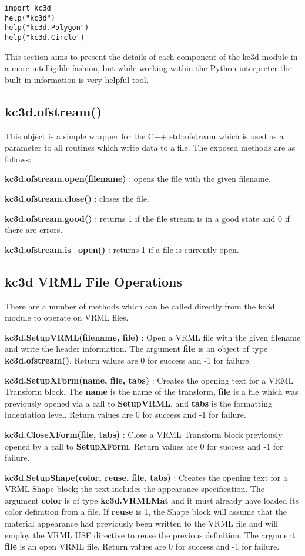 \documentclass[a4paper, dvipdfm]{article}
\begin{document}
\begin{verbatim}
import kc3d
help("kc3d")
help("kc3d.Polygon")
help("kc3d.Circle")
\end{verbatim}

This section aims to present the details of each component of the kc3d module
in a more intelligible fashion, but while working within the Python interpreter
the built-in information is very helpful tool.


\subsection{kc3d.ofstream()}
This object is a simple wrapper for the C++ std::ofstream which is used as
a parameter to all routines which write data to a file. The exposed methods
are as follows:

\textbf{kc3d.ofstream.open(filename)} : opens the file with the given filename.

\textbf{kc3d.ofstream.close()} : closes the file.

\textbf{kc3d.ofstream.good()} : returns 1 if the file stream is in a good state
and 0 if there are errors.

\textbf{kc3d.ofstream.is\_open()} : returns 1 if a file is currently open.

\subsection{kc3d VRML File Operations}
There are a number of methods which can be called directly from the
kc3d module to operate on VRML files.

\textbf{kc3d.SetupVRML(filename, file)} : Open a VRML file with the given
filename and write the header information. The argument \textbf{file}
is an object of type \textbf{kc3d.ofstream()}.  Return values are
0 for success and -1 for failure.

\textbf{kc3d.SetupXForm(name, file, tabs)} : Creates the opening
text for a VRML Transform block.  The \textbf{name} is the name
of the transform, \textbf{file} is a file which was previously opened
via a call to \textbf{SetupVRML}, and \textbf{tabs} is the
formatting indentation level. Return values are 0 for success and
-1 for failure.

\textbf{kc3d.CloseXForm(file, tabs)} : Close a VRML Transform block previously
opened by a call to \textbf{SetupXForm}. Return values are 0 for
success and -1 for failure.

\textbf{kc3d.SetupShape(color, reuse, file, tabs)} : Creates the
opening text for a VRML Shape block; the text includes the 
appearance specification. The argument \textbf{color} is of
type \textbf{kc3d.VRMLMat} and it must already have loaded its
color definition from a file. If \textbf{reuse} is 1, the
Shape block will assume that the material appearance had
previously been written to the VRML file and will employ the
VRML USE directive to reuse the previous definition.
The argument \textbf{file} is an open VRML file. Return values
are 0 for success and -1 for failure.
\end{document}

